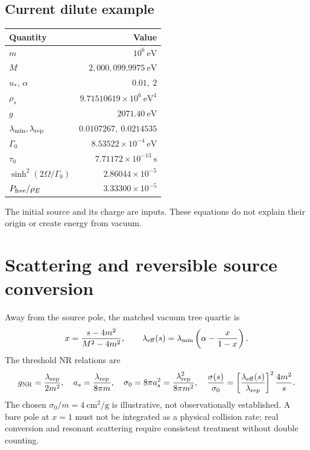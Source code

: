 \documentclass[11pt]{article}
\begin{document}
\subsection*{Current dilute example}
\begin{center}
\begin{tabular}{lr}\toprule
Quantity&Value\\\midrule
$m$&$10^6\ \mathrm{eV}$\\
$M$&$2{,}000{,}099.9975\ \mathrm{eV}$\\
$u_*$, $\alpha$&$0.01,\ 2$\\
$\rho_s$&$9.71510619\times10^6\ \mathrm{eV}^4$\\
$g$&$2071.40\ \mathrm{eV}$\\
$\lambda_{\min},\lambda_{\rm rep}$&$0.0107267,\ 0.0214535$\\
$\Gamma_0$&$8.53522\times10^{-4}\ \mathrm{eV}$\\
$\tau_0$&$7.71172\times10^{-13}\ \mathrm{s}$\\
$\sinh^2(2\Omega/\Gamma_0)$&$2.86044\times10^{-5}$\\
$P_{\rm free}/\rho_E$&$3.33300\times10^{-5}$\\\bottomrule
\end{tabular}
\end{center}
The initial source and its charge are inputs. These equations do not explain their origin or create energy from vacuum.

\section{Scattering and reversible source conversion}
Away from the source pole, the matched vacuum tree quartic is
\begin{equation}
 x=\frac{s-4m^2}{M^2-4m^2},\qquad
 \lambda_{\rm eff}(s)=\lambda_{\min}\left(\alpha-\frac{x}{1-x}\right).
\end{equation}
The threshold NR relations are
\begin{equation}
 g_{\rm NR}=\frac{\lambda_{\rm rep}}{2m^2},\quad
 a_s=\frac{\lambda_{\rm rep}}{8\pi m},\quad
 \sigma_0=8\pi a_s^2=\frac{\lambda_{\rm rep}^2}{8\pi m^2},\quad
 \frac{\sigma(s)}{\sigma_0}=\left[\frac{\lambda_{\rm eff}(s)}{\lambda_{\rm rep}}\right]^2\frac{4m^2}{s}.
\end{equation}
The chosen $\sigma_0/m=4\ \mathrm{cm^2/g}$ is illustrative, not observationally established. A bare pole at $x=1$ must not be integrated as a physical collision rate; real conversion and resonant scattering require consistent treatment without double counting.
\end{document}
